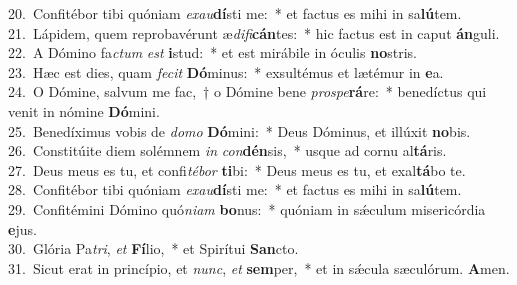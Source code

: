 {20.~}Confitébor tibi quóniam \textit{e}\textit{xau}\textbf{dí}sti me:~* et factus es mihi in sa\textbf{lú}tem.\\
{21.~}Lápidem, quem reprobavérunt æ\textit{di}\textit{fi}\textbf{cán}tes:~* hic factus est in caput \textbf{án}guli.\\
{22.~}A Dómino fa\textit{ctum} \textit{est} \textbf{i}stud:~* et est mirábile in óculis \textbf{no}stris.\\
{23.~}Hæc est dies, quam \textit{fe}\textit{cit} \textbf{Dó}minus:~* exsultémus et lætémur in \textbf{e}a.\\
{24.~}O Dómine, salvum me fac,~† o Dómine bene \textit{pro}\textit{spe}\textbf{rá}re:~* benedíctus qui venit in nómine \textbf{Dó}mini.\\
{25.~}Benedíximus vobis de \textit{do}\textit{mo} \textbf{Dó}mini:~* Deus Dóminus, et illúxit \textbf{no}bis.\\
{26.~}Constitúite diem solémnem \textit{in} \textit{con}\textbf{dén}sis,~* usque ad cornu al\textbf{tá}ris.\\
{27.~}Deus meus es tu, et confi\textit{té}\textit{bor} \textbf{ti}bi:~* Deus meus es tu, et exal\textbf{tá}bo te.\\
{28.~}Confitébor tibi quóniam \textit{e}\textit{xau}\textbf{dí}sti me:~* et factus es mihi in sa\textbf{lú}tem.\\
{29.~}Confitémini Dómino quó\textit{ni}\textit{am} \textbf{bo}nus:~* quóniam in sǽculum misericórdia \textbf{e}jus.\\
{30.~}Glória Pa\textit{tri}, \textit{et} \textbf{Fí}lio,~* et Spirítui \textbf{San}cto.\\
{31.~}Sicut erat in princípio, et \textit{nunc}, \textit{et} \textbf{sem}per,~* et in sǽcula sæculórum. \textbf{A}men.\\
